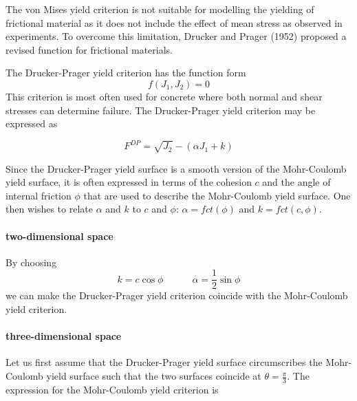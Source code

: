 The von Mises yield criterion is not suitable for modelling the yielding of frictional material as it does not include the effect of mean stress as observed in experiments. To overcome this limitation, Drucker and Prager (1952) proposed a revised function for frictional materials.

The Drucker-Prager yield criterion has the function form
\[
f(J_1, J_2) = 0 
\]
This criterion is most often used for concrete where both normal and shear stresses can determine failure. The Drucker-Prager yield criterion may be expressed as

\begin{equation}
F^{DP}=\sqrt{J_2} - (\alpha J_1 + k) \label{dpcriterion} 
\end{equation}

Since the Drucker-Prager yield surface is a smooth version of the Mohr-Coulomb yield surface, it 
is often expressed in terms of the cohesion $c$ and the angle of internal friction $\phi$ that are used 
to describe the Mohr-Coulomb yield surface. One then wishes to relate $\alpha$ and $k$ to $c$ and $\phi$:
$\alpha= fct(\phi)$ and $k= fct(c,\phi) $.


\paragraph{two-dimensional space}

By choosing 
\[
k=c \cos \phi \quad\quad\quad \alpha=\frac{1}{2}\sin \phi
\]
we can make the Drucker-Prager yield criterion coincide with the Mohr-Coulomb yield criterion.


\paragraph{three-dimensional space}

Let us first assume that the Drucker-Prager yield surface circumscribes the Mohr-Coulomb yield surface such that the two surfaces coincide at $\theta=\tfrac{\pi}{3}$. 
The expression for the Mohr-Coulomb yield criterion is

